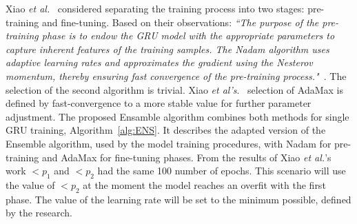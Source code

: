 %
%
Xiao \textit{et al.}~\cite{xiao_accurate_2019} considered separating the training process into two stages: pre-training and fine-tuning.
Based on their observations: \textit{``The purpose of the pre-training phase is to endow the GRU model with the appropriate parameters to capture inherent features of the training samples.
The Nadam algorithm uses adaptive learning rates and approximates the gradient using the Nesterov momentum, thereby ensuring fast convergence of the pre-training process."}~\cite[p.~54195]{xiao_accurate_2019}.
The selection of the second algorithm is trivial.
Xiao \textit{et al's}.~\cite{xiao_accurate_2019} selection of AdaMax is defined by fast-convergence to a more stable value for further parameter adjustment.
The proposed Ensamble algorithm combines both methods for single GRU training, \mbox{Algorithm~\ref{alg:ENS}}.
It describes the adapted version of the Ensemble algorithm, used by the model training procedures, with Nadam for pre-training and AdaMax for fine-tuning phases.
From the results of Xiao \textit{et al.}'s~\cite{xiao_accurate_2019} work $<p_{1}$ and $<p_{2}$ had the same 100 number of epochs.
This scenario will use the value of $<p_{2}$ at the moment the model reaches an overfit with the first phase.
The value of the learning rate will be set to the minimum possible, defined by the research.
